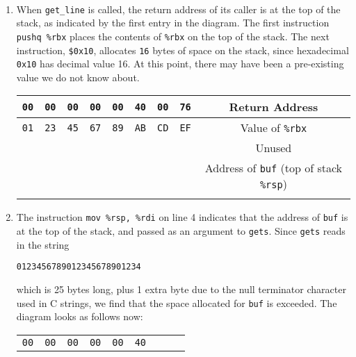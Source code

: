 \documentclass[12pt]{article}
\newenvironment{sol}[1][Solution]{\begin{trivlist}
		\item[\hskip \labelsep {\bfseries #1:}]}{\end{trivlist}}
\begin{document}
{\begin{sol}
	\
	\begin{enumerate}[label=(\alph*)]
		\item When \texttt{get\_line} is called, the return address of its caller is at the
		top of the stack, as indicated by the first entry in the diagram. The first instruction
		\texttt{pushq \%rbx} places the contents of \texttt{\%rbx} on the top of the stack.
		The next instruction, \texttt{\$0x10}, allocates \texttt{16} bytes of space on the stack,
		since hexadecimal \texttt{0x10} has decimal value 16. At this point, there may
		have been a pre-existing value we do not know about.
		\begin{center}
			\begin{tabular}{|cccccccc|c|}
				\hline
				\texttt{00} & \texttt{00} & \texttt{00} & \texttt{00} & \texttt{00} & \texttt{40}&
				\texttt{00} & \texttt{76} & Return Address\\
				\hline
				\texttt{01} & \texttt{23} & \texttt{45} & \texttt{67} & \texttt{89} & \texttt{AB}&
				\texttt{CD} & \texttt{EF} & Value of \texttt{\%rbx}\\
				\hline
				\texttt{} & \texttt{} & \texttt{} & \texttt{} & \texttt{} & \texttt{}&
				\texttt{} & \texttt{} & Unused \\
				\hline
				\texttt{} & \texttt{} & \texttt{} & \texttt{} & \texttt{} & \texttt{}&
				\texttt{} & \texttt{} & Address of \texttt{buf} (top of stack \texttt{\%rsp})\\
				\hline
				\texttt{} & \texttt{} & \texttt{} & \texttt{} & \texttt{} & \texttt{}&
				\texttt{} & \texttt{} & \\
				\hline
			\end{tabular}
		\end{center}
		\item The instruction \texttt{mov \%rsp, \%rdi} on line 4 indicates that the address of
		\texttt{buf} is at the top of the stack, and passed as an argument to \texttt{gets}.
		Since \texttt{gets} reads in the string
		\begin{center}
			\texttt{0123456789012345678901234}
		\end{center}
		which is 25 bytes long, plus 1 extra byte due to the null terminator character used in C strings,
		we find that the space allocated for \texttt{buf} is exceeded. The diagram looks as follows now:
		\begin{center}
			\begin{tabular}{|cccccccc|c|}
				\hline
				\texttt{00} & \texttt{00} & \texttt{00} & \texttt{00} & \texttt{00} & \texttt{40}&

\end{tabular}
\end{center}
\end{enumerate}
\end{sol}}
\end{document}

